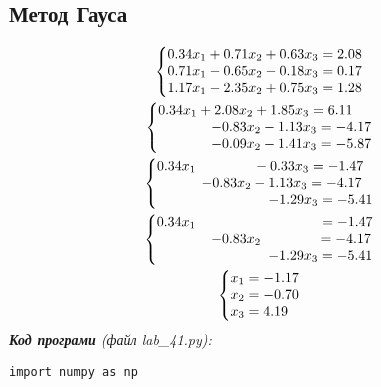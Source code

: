\documentclass{article}
\newcommand\lab{4}
\begin{document}
\begin{large}
		\subsection*{Метод Гауса}
		\begin{gather}\nonumber
		\left\{\begin{array}{@{}l@{}}
			0.34x_1 + 0.71x_2 + 0.63x_3 = 2.08\\\nonumber
			0.71x_1 - 0.65x_2 - 0.18x_3 = 0.17\\\nonumber
			1.17x_1 - 2.35x_2 + 0.75x_3 = 1.28\nonumber
		\end{array}\right.\,\\
		\left\{\begin{array}{@{}l@{}}
			0.34x_1 + 2.08x_2 + 1.85x_3 = 6.11\\\nonumber
			\hspace{38pt} - 0.83x_2 - 1.13x_3 = -4.17\\\nonumber
			\hspace{38pt} - 0.09x_2 - 1.41x_3 = -5.87\nonumber
		\end{array}\right.\,\\
		\left\{\begin{array}{@{}l@{}}
			0.34x_1 \hspace{41pt} -0.33x_3 = -1.47\\\nonumber
			\hspace{32pt} -0.83x_2 -1.13x_3 = -4.17\\\nonumber
			\hspace{80pt}- 1.29x_3 = -5.41\nonumber
		\end{array}\right.\,\\
		\left\{\begin{array}{@{}l@{}}
			0.34x_1 \hspace{88pt} = -1.47\\\nonumber
			\hspace{39pt} -0.83x_2 \hspace{40pt} = -4.17\\\nonumber
			\hspace{80pt} -1.29x_3 = -5.41\nonumber
		\end{array}\right.\,\\
		\left\{\begin{array}{@{}l@{}}
			x_1 = -1.17\\\nonumber
			x_2 = -0.70\\\nonumber
			x_3 = 4.19\nonumber
		\end{array}\right.\,
		\end{gather}	
		\noindent\textit{\textbf{Код програми} (файл lab\_\lab1.py):}
		\begin{lstlisting}
import numpy as np


\end{lstlisting}
\end{large}
\end{document}
